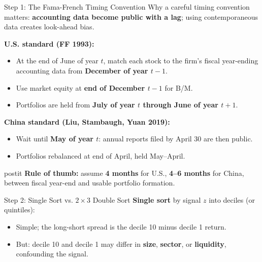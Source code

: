 \documentclass{beamer}
\begin{document}
\begin{frame}{Step 1: The Fama-French Timing Convention}
	Why a careful timing convention matters: \textbf{accounting data become public with a lag}; using contemporaneous data creates look-ahead bias.

	\vspace{0.3cm}
	\textbf{U.S. standard (FF 1993):}
	\begin{itemize}
		\item At the end of June of year $t$, match each stock to the firm's fiscal year-ending accounting data from \textbf{December of year $t-1$}.
		\item Use market equity at \textbf{end of December $t-1$} for B/M.
		\item Portfolios are held from \textbf{July of year $t$ through June of year $t+1$}.
	\end{itemize}

	\vspace{0.2cm}
	\textbf{China standard (Liu, Stambaugh, Yuan 2019):}
	\begin{itemize}
		\item Wait until \textbf{May of year $t$}: annual reports filed by April 30 are then public.
		\item Portfolios rebalanced at end of April, held May--April.
	\end{itemize}

	\begin{beamercolorbox}[sep=0.35em,wd=\linewidth,rounded=true,shadow=true]{postit}
		\textbf{Rule of thumb:} assume \textbf{4 months} for U.S., \textbf{4--6 months} for China, between fiscal year-end and usable portfolio formation.
	\end{beamercolorbox}
\end{frame}

\begin{frame}{Step 2: Single Sort vs. $2\times 3$ Double Sort}
	\textbf{Single sort} by signal $z$ into deciles (or quintiles):
	\begin{itemize}
		\item Simple; the long-short spread is the decile 10 minus decile 1 return.
		\item But: decile 10 and decile 1 may differ in \textbf{size}, \textbf{sector}, or \textbf{liquidity}, confounding the signal.
	\end{itemize}

\end{frame}
\end{document}
